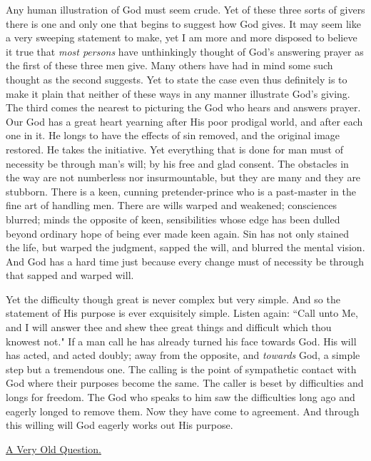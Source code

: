 Any human illustration of God must seem crude. Yet of these three sorts of
givers there is one and only one that begins to suggest how God gives. It
may seem like a very sweeping statement to make, yet I am more and more
disposed to believe it true that \textit{most persons} have unthinkingly thought
of God's answering prayer as the first of these three men give. Many
others have had in mind some such thought as the second suggests. Yet to
state the case even thus definitely is to make it plain that neither of
these ways in any manner illustrate God's giving. The third comes the
nearest to picturing the God who hears and answers prayer. Our God has a
great heart yearning after His poor prodigal world, and after each one in
it. He longs to have the effects of sin removed, and the original image
restored. He takes the initiative. Yet everything that is done for man
must of necessity be through man's will; by his free and glad consent. The
obstacles in the way are not numberless nor insurmountable, but they are
many and they are stubborn. There is a keen, cunning pretender-prince who
is a past-master in the fine art of handling men. There are wills warped
and weakened; consciences blurred; minds the opposite of keen,
sensibilities whose edge has been dulled beyond ordinary hope of being
ever made keen again. Sin has not only stained the life, but warped the
judgment, sapped the will, and blurred the mental vision. And God has a
hard time just because every change must of necessity be through that
sapped and warped will.

Yet the difficulty though great is never complex but very simple. And so
the statement of His purpose is ever exquisitely simple. Listen again:
``Call unto Me, and I will answer thee and shew thee great things and
difficult which thou knowest not." If a man call he has already turned his
face towards God. His will has acted, and acted doubly; away from the
opposite, and \textit{towards} God, a simple step but a tremendous one. The
calling is the point of sympathetic contact with God where their purposes
become the same. The caller is beset by difficulties and longs for
freedom. The God who speaks to him saw the difficulties long ago and
eagerly longed to remove them. Now they have come to agreement. And
through this willing will God eagerly works out His purpose.



\underline{A Very Old Question.}


